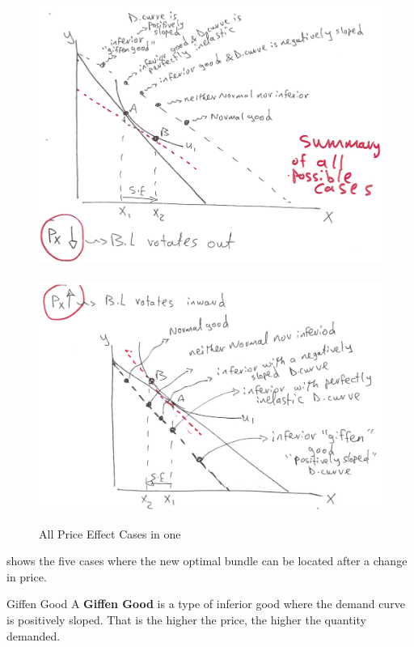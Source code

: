 \documentclass[../ECON-281-Notes.tex]{subfiles}
\begin{document}
\begin{figure}[t]
    \centering
    \includegraphics[width=\columnwidth]{../assets/PE-decrease-all.png}
    \\~\\
    \includegraphics[width=\columnwidth]{../assets/PE-increase-all.png}
    \caption{All Price Effect Cases in one}
    \label{fig:all_pe_in_one}
\end{figure}

 shows the five cases where the new optimal bundle can be located after a change in price. 

\begin{Definition}
    {Giffen Good}
    A \textbf{Giffen Good} is a type of inferior good where the demand curve is positively sloped. That is the higher the price, the higher the quantity demanded.
\end{Definition}
\end{document}
